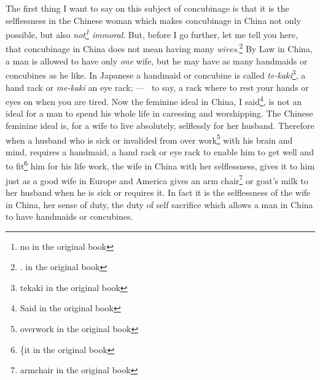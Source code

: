 The first thing I want to say on this subject of concubinage is that it is the selflessness in the Chinese woman which makes concubinage in China not only possible, but also \emph{not\footnote{no in the original book} immoral}.
But, before I go further, let me tell you here, that concubinage in China does not mean having many \emph{wives}.\footnote{\large{.} in the original book} 
By Law in China, a man is allowed to have only \emph{one} wife, but he may have as many handmaids or concubines as he like.
In Japanese a handmaid or concubine is called \emph{te-kaki}\footnote{tekaki in the original book}, a hand rack or \emph{me-kaki} an eye rack; --- \ie\, to say, a rack where to rest your hands or eyes on when you are tired.
Now the feminine ideal in China, I said\footnote{Said in the original book}, is not an ideal for a man to spend his whole life in caressing and worshipping.
The Chinese feminine ideal is, for a wife to live absolutely, selflessly for her husband.
Therefore when a husband who is sick or invalided from over work\footnote{overwork in the original book} with his brain and mind, requires a handmaid, a hand rack or eye rack to enable him to get well and to fit\footnote{\{it in the original book} him for his life work, the wife in China with her selflessness, gives it to him just as a good wife in Europe and America gives an arm chair\footnote{armchair in the original book} or goat's milk to her husband when he is sick or requires it.
In fact it is the selflessness of the wife in China, her sense of duty, the duty of self sacrifice which allows a man in China to have handmaids or concubines.

